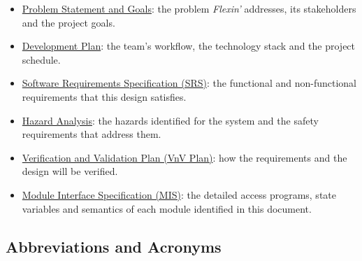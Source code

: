 \documentclass[12pt, titlepage]{article}
\begin{document}
\begin{itemize}
\item \href{https://github.com/arjunkarthik123/fitness-finance-application/blob/main/pdfs/ProblemStatementAndGoals/ProblemStatement.pdf}{Problem Statement and Goals}:
  the problem \textit{Flexin'} addresses, its stakeholders and the project goals.
\item \href{https://github.com/arjunkarthik123/fitness-finance-application/blob/main/pdfs/DevelopmentPlan/DevelopmentPlan.pdf}{Development Plan}:
  the team's workflow, the technology stack and the project schedule.
\item \href{https://github.com/arjunkarthik123/fitness-finance-application/blob/main/pdfs/SRS-Volere/SRS.pdf}{Software Requirements Specification (SRS)}:
  the functional and non-functional requirements that this design satisfies.
\item \href{https://github.com/arjunkarthik123/fitness-finance-application/blob/main/pdfs/HazardAnalysis/HazardAnalysis.pdf}{Hazard Analysis}:
  the hazards identified for the system and the safety requirements that
  address them.
\item \href{https://github.com/arjunkarthik123/fitness-finance-application/blob/main/pdfs/VnVPlan/VnVPlan.pdf}{Verification and Validation Plan (VnV Plan)}:
  how the requirements and the design will be verified.
\item \href{https://github.com/arjunkarthik123/fitness-finance-application/blob/main/pdfs/Design/SoftDetailedDes/MIS.pdf}{Module Interface Specification (MIS)}:
  the detailed access programs, state variables and semantics of each module
  identified in this document.
\end{itemize}

\subsection{Abbreviations and Acronyms}
\end{document}
